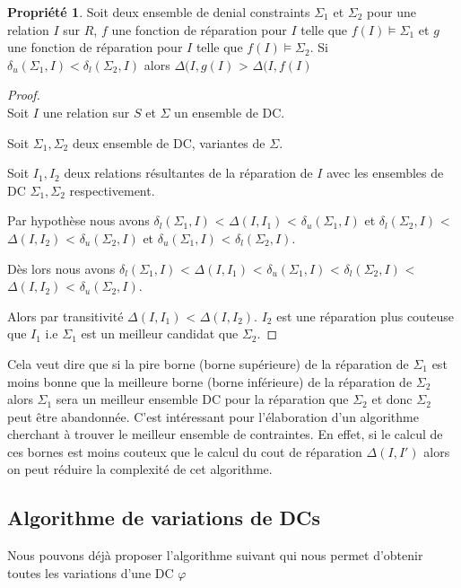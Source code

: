 \documentclass[letterpaper, 12pt]{report}
\theoremstyle{definition}
\newtheorem{myprop}{Propriété}
\begin{document}
\begin{myprop}
\label{boundRemove}
	Soit deux ensemble de denial constraints $\Sigma_1$ et $\Sigma_2$ pour une relation $I$ sur $R$, $f$ une fonction de réparation pour $I$ telle que $f(I)\models \Sigma_1$ et  $g$ une fonction de réparation pour $I$ telle que $f(I)\models \Sigma_2$. Si $\delta_u(\Sigma_1,I) < \delta_l(\Sigma_2,I)$ alors $\Delta(I,g(I)$ > $\Delta(I,f(I)$
\end{myprop}


\begin{proof}~\\
\hspace*{0.5cm} Soit $I$ une relation sur $S$ et $\Sigma$ un ensemble de DC.

Soit $\Sigma_1 , \Sigma_2$ deux ensemble de DC, variantes de $\Sigma$.

Soit $I_1 , I_2$ deux relations résultantes de la réparation de $I$ avec les ensembles de DC $\Sigma_1, \Sigma_2$ respectivement.

Par hypothèse nous avons $\delta_l(\Sigma_1,I)$ < $\Delta(I,I_1)$ < $\delta_u(\Sigma_1,I)$ et $\delta_l(\Sigma_2,I)$ < $\Delta(I,I_2)$ < $\delta_u(\Sigma_2,I)$ et $\delta_u(\Sigma_1,I)$ < $\delta_l(\Sigma_2,I)$.

Dès lors nous avons $\delta_l(\Sigma_1,I)$ < $\Delta(I,I_1)$ < $\delta_u(\Sigma_1,I)$ < $\delta_l(\Sigma_2,I)$ < $\Delta(I,I_2)$ < $\delta_u(\Sigma_2,I)$.

Alors par transitivité  $\Delta(I,I_1)$ < $\Delta(I,I_2)$. $I_2$ est une réparation plus couteuse que $I_1$ i.e $\Sigma_1$ est un meilleur candidat que $\Sigma_2$.
\end{proof}

Cela veut dire que si la pire borne (borne supérieure) de la réparation de $\Sigma_1$ est moins bonne que la meilleure borne (borne inférieure) de la réparation de $\Sigma_2$ alors $\Sigma_1$ sera un meilleur ensemble DC pour la réparation que $\Sigma_2$ et donc $\Sigma_2$ peut être abandonnée. C'est intéressant pour l'élaboration d'un algorithme cherchant à trouver le meilleur ensemble de contraintes. En effet, si le calcul de ces bornes est moins couteux que le calcul du cout de réparation $\Delta(I,I')$ alors on peut réduire la complexité de cet algorithme.

\subsection{Algorithme de variations de DCs}
Nous pouvons déjà proposer l'algorithme suivant qui nous permet d'obtenir toutes les variations d'une DC $\varphi$
\end{document}
